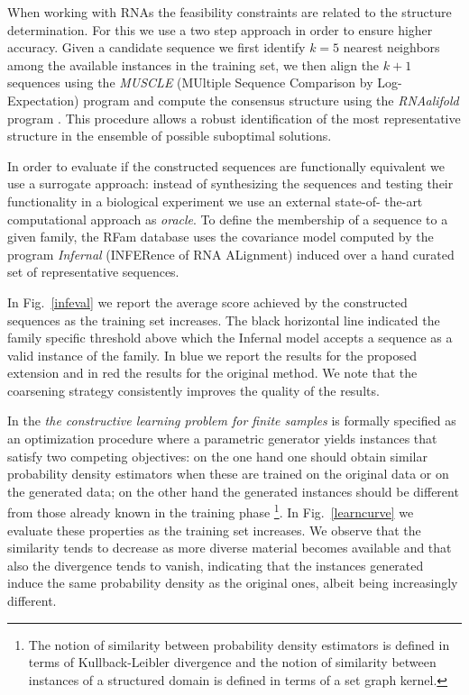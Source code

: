 \documentclass{article}
\begin{document}
When working with RNAs the feasibility constraints are related to the
structure determination. For this we use a two step approach in order to
ensure higher accuracy. Given a candidate sequence we first identify $k=5$
nearest neighbors among the available instances in the training set, we then
align the $k+1$ sequences using the \emph{MUSCLE} (MUltiple Sequence
Comparison by Log- Expectation) program \citep{muscle} and compute the
consensus structure using the \emph{RNAalifold} program \citep{rnaalifold}.
This procedure allows a robust identification of the most representative
structure in the ensemble of possible suboptimal solutions.

In order to evaluate if the constructed sequences are functionally equivalent
we use a surrogate approach: instead of synthesizing the sequences and testing
their functionality in a biological experiment we use an external state-of-
the-art computational approach as {\em oracle}. To define the membership of a
sequence to a given family, the RFam database uses the covariance model
computed by the program \emph{Infernal} (INFERence of RNA ALignment)
\citep{infernal} induced over a hand curated set of representative sequences.

In Fig.~\ref{infeval} we report the average score achieved by the constructed
sequences as the training set increases. The black horizontal line indicated
the family specific threshold above which the Infernal model accepts a
sequence as a valid instance of the family. In blue we report the results for
the proposed extension and in red the results for the original method. We note
that the coarsening strategy consistently improves the quality of the results.

In \cite{costa16} the \emph{the constructive learning problem for finite
samples} is formally specified as an optimization procedure where a parametric
generator yields instances that satisfy two competing objectives: on the one
hand one should obtain similar probability density estimators when these are
trained on the original data or on the generated data; on the other hand the
generated instances should be different from those already known in the
training phase \footnote{The notion of similarity between probability density
estimators is defined in terms of Kullback-Leibler divergence and the notion
of similarity between instances of a structured domain is defined in terms of
a set graph kernel.}. In Fig.~\ref{learncurve} we evaluate these properties as
the training set increases. We observe that the similarity tends to decrease
as more diverse material becomes available and that also the divergence tends
to vanish, indicating that the instances generated induce the same probability
density as the original ones, albeit being increasingly different.
\end{document}
